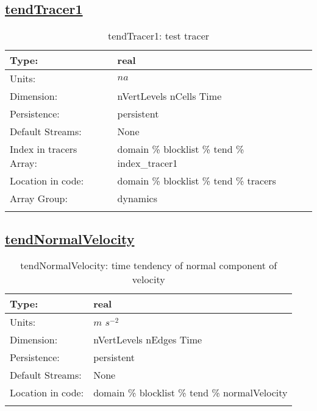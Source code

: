\subsection[tendTracer1]{\hyperref[sec:var_tab_tend]{tendTracer1}}
\label{subsec:var_sec_tend_tendTracer1}
\begin{center}
\begin{longtable}{| p{2.0in} | p{4.0in} |}
        \hline 
        Type: & real \\
        \hline 
        Units: & $na$ \\
        \hline 
        Dimension: & nVertLevels nCells Time \\
        \hline 
        Persistence: & persistent \\
        \hline 
		 Default Streams: & None \\
        \hline 
		 Index in tracers Array: & domain \% blocklist \% tend \% index\_tracer1 \\
		 \hline 
		 Location in code: & domain \% blocklist \% tend \% tracers \\
		 \hline 
		 Array Group: & dynamics \\
		 \hline 
    \caption{tendTracer1: test tracer}
\end{longtable}
\end{center}
\subsection[tendNormalVelocity]{\hyperref[sec:var_tab_tend]{tendNormalVelocity}}
\label{subsec:var_sec_tend_tendNormalVelocity}
\begin{center}
\begin{longtable}{| p{2.0in} | p{4.0in} |}
        \hline 
        Type: & real \\
        \hline 
        Units: & $m$ $s^{-2}$ \\
        \hline 
        Dimension: & nVertLevels nEdges Time \\
        \hline 
        Persistence: & persistent \\
        \hline 
		 Default Streams: & None \\
        \hline 
		 Location in code: & domain \% blocklist \% tend \% normalVelocity \\
		 \hline 
    \caption{tendNormalVelocity: time tendency of normal component of velocity}
\end{longtable}
\end{center}
